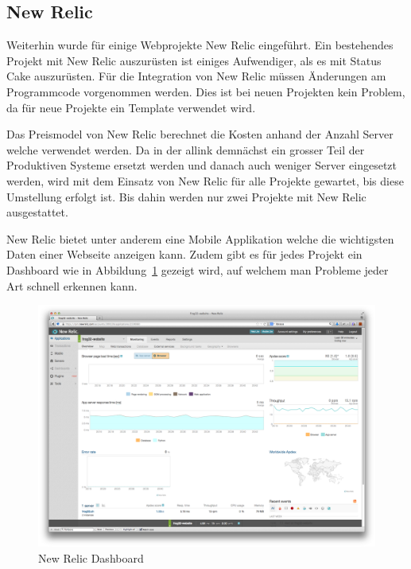 \subsection{New Relic}
\label{sub:new_relic}
Weiterhin wurde für einige Webprojekte New Relic eingeführt. Ein bestehendes Projekt mit New Relic auszurüsten ist einiges Aufwendiger, als es mit Status Cake auszurüsten. Für die Integration von New Relic müssen Änderungen am Programmcode vorgenommen werden. Dies ist bei neuen Projekten kein Problem, da für neue Projekte ein Template verwendet wird.

Das Preismodel von New Relic berechnet die Kosten anhand der Anzahl Server welche verwendet werden. Da in der allink demnächst ein grosser Teil der Produktiven Systeme ersetzt werden und danach auch weniger Server eingesetzt werden, wird mit dem Einsatz von New Relic für alle Projekte gewartet, bis diese Umstellung erfolgt ist. Bis dahin werden nur zwei Projekte mit New Relic ausgestattet.

New Relic bietet unter anderem eine Mobile Applikation welche die wichtigsten Daten einer Webseite anzeigen kann. Zudem gibt es für jedes Projekt ein Dashboard wie in Abbildung~\ref{fig:new_relic_dashboard} gezeigt wird, auf welchem man Probleme jeder Art schnell erkennen kann.

\begin{figure}[ht]
\centering
\includegraphics[width=1\textwidth]{images/new_relic.png}
\caption{New Relic Dashboard}
\label{fig:new_relic_dashboard}
\end{figure}


